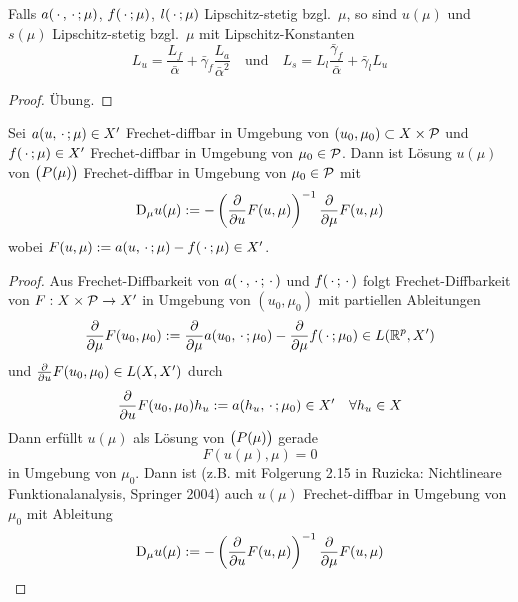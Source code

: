 \begin{satz}
	Falls $a(\,\cdot\,,\,\cdot\,;\mu)$, $f(\,\cdot\,;\mu)$, $l(\,\cdot\,;\mu)$ Lipschitz-stetig bzgl.\ $\mu$, so sind $u(\mu)$ und $s(\mu)$ Lipschitz-stetig bzgl.\ $\mu$ mit Lipschitz-Konstanten
	\[
		L_u = \frac{L_f}{\bar\alpha} + \bar\gamma_f \frac{L_a}{\bar\alpha^2} \quad \text{und} \quad L_s = L_l \frac{\bar\gamma_f}{\bar\alpha} + \bar\gamma_l L_u
	\]

	\begin{proof}
		Übung.
	\end{proof}
\end{satz}

\begin{satz}[Diffbarkeit]
	Sei $a(u,\,\cdot\,;\mu) \in X'$ Frechet-diffbar in Umgebung von $(u_0,\mu_0) \subset X \times \mathcal{P}$ und $f(\,\cdot\,; \mu) \in X'$ Frechet-diffbar in Umgebung von $\mu_0 \in \mathcal{P}$.
	Dann ist Lösung $u(\mu)$ von $\big(P(\mu)\big)$ Frechet-diffbar in Umgebung von $\mu_0 \in \mathcal{P}$ mit
	\[
		\mathrm{D}_\mu u(\mu) := -\left(\frac{\partial}{\partial {u}} F(u,\mu) \right)^{-1} \frac{\partial}{\partial {\mu}} F(u,\mu)
	\]
	wobei $F(u,\mu) := a(u,\,\cdot\,;\mu) - f(\,\cdot\,;\mu) \in X'$.

	\begin{proof}
		Aus Frechet-Diffbarkeit von $a(\,\cdot\,,\,\cdot\,;\,\cdot\,)$ und $f(\,\cdot\,;\,\cdot\,)$ folgt Frechet-Diffbarkeit von $F : X \times \mathcal{P} \to X'$ in Umgebung von $(u_0,\mu_0)$ mit partiellen Ableitungen
		\[
			\frac{\partial}{\partial {\mu}} F(u_0,\mu_0) := \frac{\partial}{\partial {\mu}} a(u_0,\,\cdot\,;\mu_0) - \frac{\partial}{\partial {\mu}} f(\,\cdot\,;\mu_0) \in L(\mathbb{R}^p,X')
		\]
		und $\frac{\partial}{\partial {u}} F(u_0,\mu_0) \in L(X,X')$ durch
		\[
			\frac{\partial}{\partial {u}} F(u_0,\mu_0) h_u := a(h_u,\,\cdot\,;\mu_0) \in X' \quad \forall h_u \in X
		\]
		Dann erfüllt $u(\mu)$ als Lösung von $\big(P(\mu)\big)$ gerade
		\[
			F(u(\mu),\mu) = 0
		\]
		in Umgebung von $\mu_0$.
		Dann ist (z.B. mit Folgerung 2.15 in Ruzicka: Nichtlineare Funktionalanalysis, Springer 2004) auch $u(\mu)$ Frechet-diffbar in Umgebung von $\mu_0$ mit Ableitung
		\[
			\mathrm{D}_\mu u(\mu) := -\left(\frac{\partial}{\partial {u}} F(u,\mu) \right)^{-1} \frac{\partial}{\partial {\mu}} F(u,\mu)
		\]
	\end{proof}
\end{satz}

